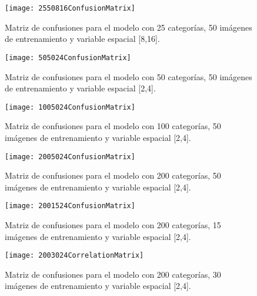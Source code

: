 \documentclass[10pt,twocolumn,letterpaper]{article}
\begin{document}
\begin{figure}
\begin{center}
   \texttt{[image: 2550816ConfusionMatrix]}
\end{center}
   \caption{Matriz de confusiones para el modelo con 25 categorías, 50 imágenes de entrenamiento y variable espacial [8,16].}
\end{figure}

\begin{figure}
\begin{center}
   \texttt{[image: 505024ConfusionMatrix]}
\end{center}
   \caption{Matriz de confusiones para el modelo con 50 categorías, 50 imágenes de entrenamiento y variable espacial [2,4].}
\end{figure}

\begin{figure}
\begin{center}
   \texttt{[image: 1005024ConfusionMatrix]}
\end{center}
   \caption{Matriz de confusiones para el modelo con 100 categorías, 50 imágenes de entrenamiento y variable espacial [2,4].}
\end{figure}

\begin{figure}
\begin{center}
   \texttt{[image: 2005024ConfusionMatrix]}
\end{center}
   \caption{Matriz de confusiones para el modelo con 200 categorías, 50 imágenes de entrenamiento y variable espacial [2,4].}
\end{figure}

\begin{figure}
\begin{center}
   \texttt{[image: 2001524ConfusionMatrix]}
\end{center}
   \caption{Matriz de confusiones para el modelo con 200 categorías, 15 imágenes de entrenamiento y variable espacial [2,4].}
\end{figure}

\begin{figure}
\begin{center}
   \texttt{[image: 2003024CorrelationMatrix]}
\end{center}
   \caption{Matriz de confusiones para el modelo con 200 categorías, 30 imágenes de entrenamiento y variable espacial [2,4].}
\end{figure}
\end{document}

